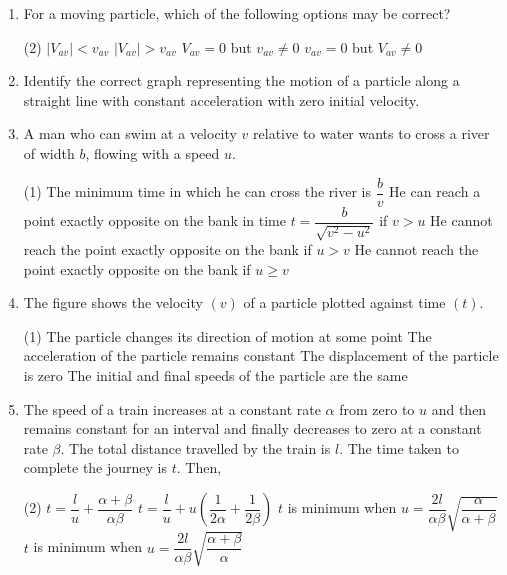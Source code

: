 \documentclass{article}
\renewcommand{\frac}[2]{\dfrac{#1}{#2}}
\begin{document}
\begin{enumerate}
    \item For a moving particle, which of the following options may be correct?
    \begin{tasks}(2)
      \task \(|V_{av}| < v_{av}\)
      \task \(|V_{av}| > v_{av}\)
      \task \(V_{av} = 0\) but \(v_{av} \neq 0\)
      \task \(v_{av} = 0\) but \(V_{av} \neq 0\)
    \end{tasks}
    
    \item Identify the correct graph representing the motion of a particle along a straight line with constant acceleration with zero initial velocity.
    
    \item A man who can swim at a velocity \(v\) relative to water wants to cross a river of width \(b\), flowing with a speed \(u\).
    \begin{tasks}(1)
      \task The minimum time in which he can cross the river is \(\frac{b}{v}\)
      \task He can reach a point exactly opposite on the bank in time \(t = \frac{b}{\sqrt{v^2 - u^2}}\) if \(v > u\)
      \task He cannot reach the point exactly opposite on the bank if \(u > v\)
      \task He cannot reach the point exactly opposite on the bank if \(u \geq v\)
    \end{tasks}
  
    \item The figure shows the velocity \((v)\) of a particle plotted against time \((t)\). 
    \begin{tasks}(1)
        \task The particle changes its direction of motion at some point
        \task The acceleration of the particle remains constant
        \task The displacement of the particle is zero
        \task The initial and final speeds of the particle are the same
    \end{tasks}
    
    \item The speed of a train increases at a constant rate \(\alpha\) from zero to \(u\) and then remains constant for an interval and finally decreases to zero at a constant rate \(\beta\). The total distance travelled by the train is \(l\). The time taken to complete the journey is \(t\). Then,
    \begin{tasks}(2)
        \task \( t = \dfrac{l}{u} + \dfrac{\alpha + \beta}{\alpha \beta} \)
        \task \( t = \dfrac{l}{u} + u \left( \dfrac{1}{2 \alpha} + \dfrac{1}{2 \beta} \right) \)
        \task \( t \) is minimum when \( u = \dfrac{2l}{\alpha \beta} \sqrt{\dfrac{\alpha}{\alpha + \beta}} \)
        \task \( t \) is minimum when \( u = \dfrac{2l}{\alpha \beta} \sqrt{\dfrac{\alpha + \beta}{\alpha}} \)
    \end{tasks}
    

\end{enumerate}
\end{document}
